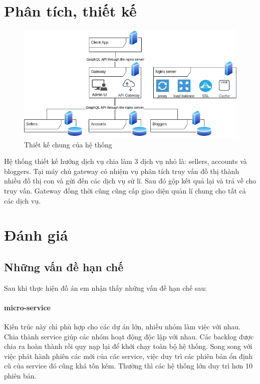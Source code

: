 \documentclass[11pt]{report}
\begin{document}
\section{Phân tích, thiết kế}\label{section:readme}
\begin{figure}[h!]
	\begin{center}	
		\includegraphics[width=\textwidth]{srs}
		\caption{Thiết kế chung của hệ thống}
	\end{center}
\end{figure}
Hệ thống thiết kế hướng dịch vụ chia làm 3 dịch vụ nhỏ là: sellers, accounts và bloggers. Tại máy chủ gateway có nhiệm vụ phân tích truy vấn đồ thị thành nhiều đồ thị con và gửi đến các dịch vụ sử lí. Sau đó gộp kết quả lại và trả về cho truy vấn. Gateway đồng thời cũng cũng cấp giao diện quản lí chung cho tất cả các dịch vụ.



%
% 








\section{Đánh giá}
\subsection{Những vấn đề hạn chế}
Sau khi thực hiện đồ án em nhận thấy những vấn đề hạn chế sau:
\paragraph{micro-service} Kiến trúc này chỉ phù hợp cho các dự án lớn, nhiều nhóm làm việc với nhau. Chia thành service giúp các nhóm hoạt động độc lập với nhau. Các backlog được chia ra hoàn thành rồi quy nạp lại để khởi chạy toàn bộ hệ thống. Song song với việc phát hành phiên các mới của các service, việc duy trì các phiên bản ổn định cũ của service đó cũng khá tốn kém. Thường thì các hệ thống lớn duy trì hơn 10 phiên bản.
\end{document}
